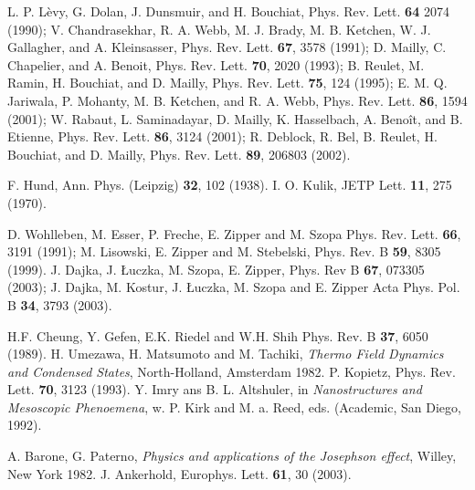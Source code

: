 \documentclass[a4paper,final]{appolb}
\begin{document}
\begin{thebibliography}{99}
 L. P. L\`evy, G. Dolan, J. Dunsmuir, and H. Bouchiat,  Phys. Rev. Lett. {\bf 64} 2074 (1990); 
 V. Chandrasekhar, R. A. Webb, M. J. Brady, M. B. Ketchen, W. J. Gallagher, and A. Kleinsasser, Phys. Rev. Lett. {\bf 67}, 3578 (1991); 
 D. Mailly, C. Chapelier, and A. Benoit, Phys. Rev. Lett. {\bf 70}, 2020 (1993); 
B. Reulet, M. Ramin, H. Bouchiat, and D. Mailly, Phys. Rev. Lett. {\bf 75}, 124 (1995);
 E. M. Q. Jariwala, P. Mohanty, M. B. Ketchen, and R. A. Webb, Phys. Rev. Lett. {\bf 86}, 1594 (2001); 
W. Rabaut, L. Saminadayar, D. Mailly, K. Hasselbach, A. Beno\^it, and B. Etienne, Phys. Rev. Lett. {\bf 86}, 3124 (2001);
R. Deblock, R. Bel, B. Reulet, H. Bouchiat, and D. Mailly, Phys. Rev. Lett. {\bf 89}, 206803 (2002).

 F. Hund, Ann. Phys. (Leipzig) {\bf 32}, 102 (1938).
 I. O. Kulik, JETP Lett. {\bf 11}, 275 (1970).

 D.  Wohlleben, M. Esser,  P. Freche, E. Zipper and M. Szopa Phys. Rev. Lett. {\bf 66}, 3191 (1991);
M. Lisowski, E. Zipper  and M. Stebelski,    Phys. Rev. B 
{\bf 59}, 8305 (1999). 
  J. Dajka, J. \L uczka, M. Szopa, E. Zipper, 
Phys. Rev B {\bf 67}, 073305 (2003);\linebreak 
J. Dajka, M.  Kostur,  J.  \L uczka, M.  Szopa  and E.  Zipper   Acta Phys.  Pol. {B \bf 34}, 3793 (2003).

 H.F.  Cheung, Y. Gefen, E.K. Riedel  and  W.H. Shih   Phys. Rev. B {\bf 37}, 6050 (1989).
 H. Umezawa, H. Matsumoto and M. Tachiki, {\it Thermo Field 
Dynamics
and Condensed States}, North-Holland, Amsterdam 1982.
 P. Kopietz, Phys. Rev. Lett. {\bf70}, 3123 (1993).
 Y. Imry ans B. L. Altshuler, in {\it Nanostructures and Mesoscopic Phenoemena}, w. P. Kirk and M. a. Reed, eds. (Academic, San Diego, 1992).  


 A. Barone, G. Paterno, {\it Physics and applications of 
the Josephson effect}, Willey, New York 1982. 
 J. Ankerhold, Europhys. Lett. {\bf 61}, 30 (2003).
\end{thebibliography}  
\end{document}
